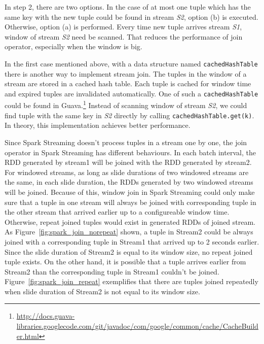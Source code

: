 In step 2, there are two options. In the case of at most one tuple which has the same key with the new tuple could be found in stream \textit{S2}, option (b) is executed. Otherwise, option (a) is performed. Every time new tuple arrives stream \textit{S1}, window of stream \textit{S2} need be scanned. That reduces the performance of join operator, especially when the window is big.

In the first case mentioned above, with a data structure named \texttt{cachedHashTable} there is another way to implement stream join. The tuples in the window of a stream are stored in a cached hash table. Each tuple is cached for window time and expired tuples are invalidated automatically. One of such a \texttt{cachedHashTable} could be found in Guava.\footnote{\url{http://docs.guava-libraries.googlecode.com/git/javadoc/com/google/common/cache/CacheBuilder.html}} Instead of scanning window of stream \textit{S2}, we could find tuple with the same key in \textit{S2} directly by calling \texttt{cachedHashTable.get(k)}. In theory, this implementation achieves better performance. 

Since Spark Streaming doesn't process tuples in a stream one by one, the join operator in Spark Streaming has different behaviours. In each batch interval, the RDD generated by stream1 will be joined with the RDD generated by stream2. For windowed streams, as long as slide durations of two windowed streams are the same, in each slide duration, the RDDs generated by two windowed streams will be joined. Because of this, window join in Spark Streaming could only make sure that a tuple in one stream will always be joined with corresponding tuple in the other stream that arrived earlier up to a configureable window time. Otherwise, repeat joined tuples would exist in generated RDDs of joined stream. As Figure~\ref{fig:spark_join_norepeat} shown, a tuple in Stream2 could be always joined with a corresponding tuple in Stream1 that arrived up to 2 seconds earlier. Since the slide duration of Stream2 is equal to its window size, no repeat joined tuple exists. On the other hand, it is possible that a tuple arrives earlier from Stream2 than the corresponding tuple in Stream1 couldn't be joined. Figure~\ref{fig:spark_join_repeat} exemplifies that there are tuples joined repeatedly  when slide duration of Stream2 is not equal to its window size.

